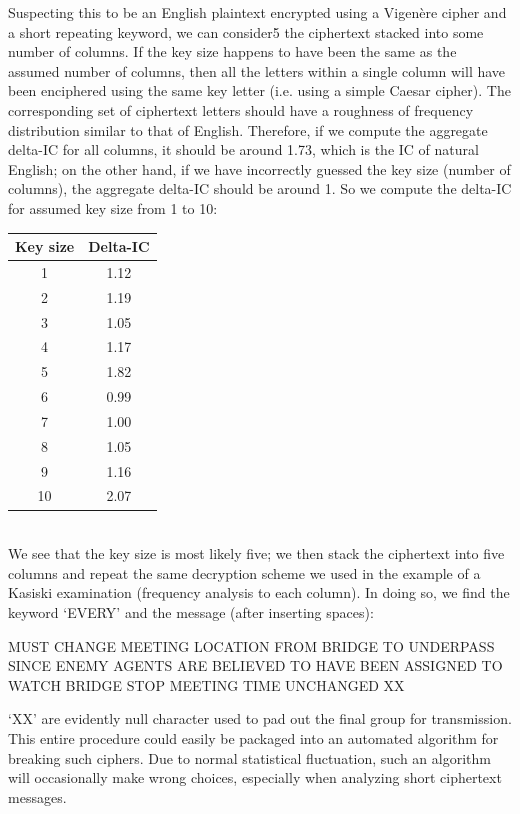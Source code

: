 \documentclass[Lau,binding=0.6cm,oneside]{sapthesis}
\begin{document}
Suspecting this to be an English plaintext encrypted using a Vigenère cipher and a short repeating keyword, we can consider5 the ciphertext stacked into some number of columns. If the key size happens to have been the same as the assumed number of columns, then all the letters within a single column will have been enciphered using the same key letter (i.e. using a simple Caesar cipher). The corresponding set of ciphertext letters should have a roughness of frequency distribution similar to that of English. Therefore, if we compute the aggregate delta-IC for all columns, it should be around 1.73, which is the IC of natural English; on the other hand, if we have incorrectly guessed the key size (number of columns), the aggregate delta-IC should be around 1. So we compute the delta-IC for assumed key size from 1 to 10:\\

\begin{center}
 \begin{tabular}{||c c||} 
 \hline
 Key size & Delta-IC\\ [0.5ex] 
 \hline\hline
 1 & 1.12\\ 
 \hline
 2 & 1.19\\
 \hline
 3 & 1.05\\
 \hline
 4 & 1.17\\
 \hline
 5 & 1.82\\
 \hline
 6 & 0.99\\
 \hline
 7 & 1.00\\
 \hline
 8 & 1.05\\
 \hline
 9 & 1.16\\
 \hline
 10 & 2.07\\
 \hline
\end{tabular}
\end{center}
\ \\
We see that the key size is most likely five; we then stack the ciphertext into five columns and repeat the same decryption scheme we used in the example of a Kasiski examination (frequency analysis to each column). In doing so, we find the keyword `EVERY' and the message (after inserting spaces):\\

\begin{displayquote}{\small{\textsf{MUST CHANGE MEETING LOCATION FROM BRIDGE TO UNDERPASS
SINCE ENEMY AGENTS ARE BELIEVED TO HAVE BEEN ASSIGNED
TO WATCH BRIDGE STOP  MEETING TIME UNCHANGED  XX}}}
\end{displayquote}

`XX' are evidently null character used to pad out the final group for transmission. This entire procedure could easily be packaged into an automated algorithm for breaking such ciphers. Due to normal statistical fluctuation, such an algorithm will occasionally make wrong choices, especially when analyzing short ciphertext messages.
\end{document}
